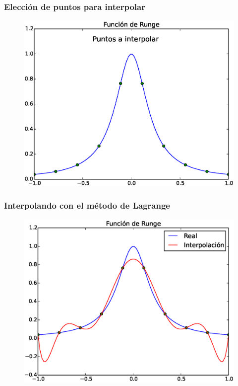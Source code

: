 \documentclass[12pt]{beamer}
\begin{document}
\begin{frame}
\frametitle{Elección de puntos para interpolar}
\begin{figure}
	\centering
	\includegraphics[scale=0.47]{Imagenes/Funcion_Runge_02.eps} 
\end{figure}
\end{frame}
\begin{frame}
\frametitle{Interpolando con el método de Lagrange}
\begin{figure}
	\centering
	\includegraphics[scale=0.45]{Imagenes/Funcion_Runge_03.eps} 
\end{figure}
\end{frame}
\end{document}
